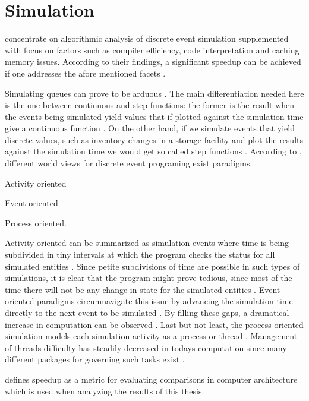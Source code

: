 \section{Simulation}
\label{sec:simulation}

\citet{Bahouth2007} concentrate on algorithmic analysis of discrete event simulation supplemented with focus on factors such as compiler efficiency, code interpretation and caching memory issues. According to their findings, a significant speedup can be achieved if one addresses the afore mentioned facets \citep{Bahouth2007}.

Simulating queues can prove to be arduous \citep{Matloff2008}. The main differentiation needed here is the one between continuous and step functions: the former is the result when the events being simulated yield values that if plotted against the simulation time give a continuous function \citep{Matloff2008}. On the other hand, if we simulate events that yield discrete values, such as inventory changes in a storage facility and plot the results against the simulation time we would get so called step functions \citep{Matloff2008}.
According to \citet{Matloff2008}, different world views for discrete event programing exist \ie paradigms:
\begin{enumerate*}
	\item Activity oriented
	\item Event oriented
	\item Process oriented.
\end{enumerate*}
Activity oriented can be summarized as simulation events where time is being subdivided in tiny intervals at which the program checks the status for all simulated entities \citep{Matloff2008}. Since petite subdivisions of time are possible in such types of simulations, it is clear that the program might prove tedious, since most of the time there will not be any change in state for the simulated entities \citep{Matloff2008}. Event oriented paradigms circumnavigate this issue by advancing the simulation time directly to the next event to be simulated \citep{Matloff2008}. By filling these gaps, a dramatical increase in computation can be observed \citep{Matloff2008}. Last but not least, the process oriented simulation models each simulation activity as a process or thread \citep{Matloff2008}. Management of threads difficulty has steadily decreased in todays computation since many different packages for governing such tasks exist \citep{Matloff2008}.

\citet{Milo2012} defines speedup as a metric for evaluating comparisons in computer architecture which is used when analyzing the results of this thesis.